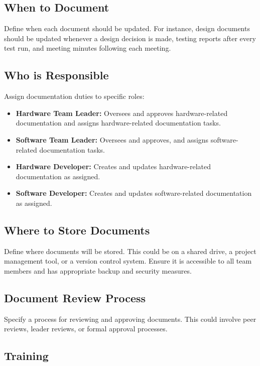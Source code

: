 \documentclass[10pt]{projectdoc}
\begin{document}
\subsection{When to Document}

Define when each document should be updated. For instance, design documents should be updated whenever a design decision is made, testing reports after every test run, and meeting minutes following each meeting.

\subsection{Who is Responsible}

Assign documentation duties to specific roles:

\begin{itemize}
\item \textbf{Hardware Team Leader:} Oversees and approves hardware-related documentation and assigns hardware-related documentation tasks.
\item \textbf{Software Team Leader:} Oversees and approves, and assigns software-related documentation tasks.
\item \textbf{Hardware Developer:} Creates and updates hardware-related documentation as assigned.
\item \textbf{Software Developer:} Creates and updates software-related documentation as assigned.
\end{itemize}

\subsection{Where to Store Documents}

Define where documents will be stored. This could be on a shared drive, a project management tool, or a version control system. Ensure it is accessible to all team members and has appropriate backup and security measures.

\subsection{Document Review Process}

Specify a process for reviewing and approving documents. This could involve peer reviews, leader reviews, or formal approval processes.

\subsection{Training}
\end{document}
